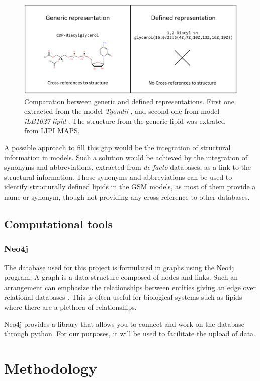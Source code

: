\documentclass{llncs}
\begin{document}
\begin{figure}
    \includegraphics[width=\textwidth]{imagens/comparação.png}
    \caption{Comparation between generic and defined representations. First one extracted from the model \textit{Tgondii} \cite{Tymoshenko2015}, and second one from model \textit{iLB1027-lipid} \cite{Levering2016}. The structure from the generic lipid was extrated from LIPI MAPS.}
\end{figure}

A possible approach to fill this gap would be the integration of structural information in models. 
Such a solution would be achieved by the integration of synonyms and abbreviations, extracted from \textit{de facto} databases, as a link to the structural information. Those synonyms and abbreviations can be used to identify structurally defined lipids in the GSM models, as most of them provide a name or synonym, though not providing any cross-reference to other databases. 

\subsection{Computational tools}
\subsubsection{Neo4j}
The database used for this project is formulated in graphs using the Neo4j program. A graph is a data structure composed of nodes and links. 
Such an arrangement can emphasize the relationships between entities giving an edge over relational databases \cite{Miller2013}. 
This is often useful for biological systems such as lipids where there are a plethora of relationships.

Neo4j provides a library that allows you to connect and work on the database through python. 
For our purposes, it will be used to facilitate the upload of data.

\section{Methodology}
\end{document}
